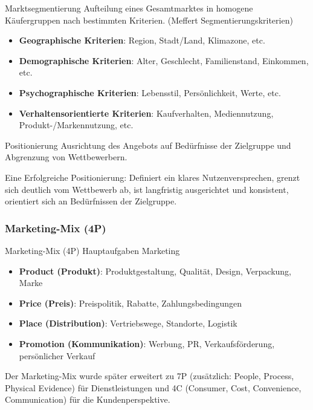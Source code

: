 \begin{definition}{Marktsegmentierung} 
    Aufteilung eines Gesamtmarktes in homogene Käufergruppen nach bestimmten Kriterien. (Meffert Segmentierungskriterien)
\begin{itemize}
    \item \textbf{Geographische Kriterien}: Region, Stadt/Land, Klimazone, etc.
    \item \textbf{Demographische Kriterien}: Alter, Geschlecht, Familienstand, Einkommen, etc.
    \item \textbf{Psychographische Kriterien}: Lebensstil, Persönlichkeit, Werte, etc.
    \item \textbf{Verhaltensorientierte Kriterien}: Kaufverhalten, Mediennutzung, Produkt-/Markennutzung, etc.
\end{itemize}
\end{definition}

\begin{definition}{Positionierung}
    Ausrichtung des Angebots auf Bedürfnisse der Zielgruppe und Abgrenzung von Wettbewerbern.  
    
    Eine Erfolgreiche Positionierung: Definiert ein klares Nutzenversprechen, grenzt sich deutlich vom Wettbewerb ab, 
    ist langfristig ausgerichtet und konsistent, orientiert sich an Bedürfnissen der Zielgruppe.
\end{definition}

\subsubsection{Marketing-Mix (4P)}

\begin{KR}{Marketing-Mix (4P)} Hauptaufgaben Marketing
\begin{itemize}
    \item \textbf{Product (Produkt)}: Produktgestaltung, Qualität, Design, Verpackung, Marke
    \item \textbf{Price (Preis)}: Preispolitik, Rabatte, Zahlungsbedingungen
    \item \textbf{Place (Distribution)}: Vertriebswege, Standorte, Logistik
    \item \textbf{Promotion (Kommunikation)}: Werbung, PR, Verkaufsförderung, persönlicher Verkauf
\end{itemize}

Der Marketing-Mix wurde später erweitert zu 7P (zusätzlich: People, Process, Physical Evidence) für Dienstleistungen und 4C (Consumer, Cost, Convenience, Communication) für die Kundenperspektive.
\end{KR}

